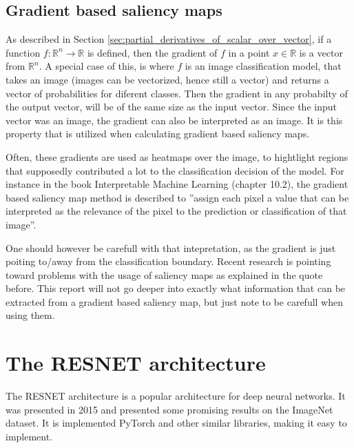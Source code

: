 \subsection{Gradient based saliency maps} \label{sec:gradiant_saliency_maps}
As described in Section \ref{sec:partial_derivatives_of_scalar_over_vector},
if a function $f: \mathbb{R}^n \rightarrow \mathbb{R}$ is defined,
then the gradient of $f$ in a point $x\in\mathbb{R}$ is a vector from $\mathbb{R}^n$.
A special case of this, is where $f$ is an image classification model, that takes
an image (images can be vectorized, hence still a vector) and returns a vector of probabilities for
diferent classes.
Then the gradient in any probabilty of the output vector, will be of the same size as the input vector.
Since the input vector was an image, the gradient can also be interpreted as an image.
It is this property that is utilized when calculating gradient based saliency maps.

Often, these gradients are used as heatmaps over the image, to hightlight regions that 
supposedly contributed a lot to the classification decision of the model. 
For instance in the book Interpretable Machine Learning (chapter 10.2)\cite{interpretable-machine-learning}, the gradient based 
saliency map method is described to
''assign each pixel a value that can be interpreted as the relevance of the pixel to the prediction or classification of that image''.

One should however be carefull with that intepretation, as the gradient is just poiting to/away from the classification boundary.
Recent research is pointing toward problems with the usage of saliency maps as explained in the quote before\cite{false-hope}.
This report will not go deeper into exactly what information that can be extracted from a gradient based saliency map,
but just note to be carefull when using them.

\section{The RESNET architecture}
The RESNET architecture is a popular architecture for deep neural networks.
It was presented in 2015 and presented some promising results on the ImageNet dataset\cite{RESNET-paper}.
It is implemented PyTorch and other similar libraries, making it easy to implement.

